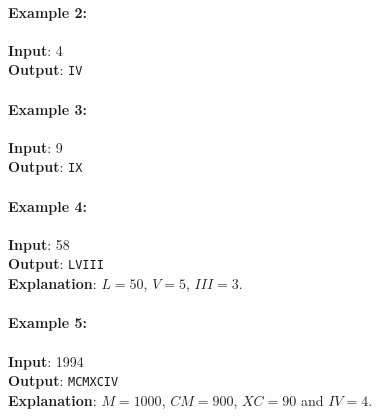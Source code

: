 \paragraph{Example 2:}
\begin{flushleft}
\textbf{Input}: 4
\\
\textbf{Output}: \texttt{IV}
\end{flushleft}

\paragraph{Example 3:}
\begin{flushleft}
\textbf{Input}: 9
\\
\textbf{Output}: \texttt{IX}
\end{flushleft}

\paragraph{Example 4:}
\begin{flushleft}
\textbf{Input}: 58
\\
\textbf{Output}: \texttt{LVIII}
\\
\textbf{Explanation}: $L = 50$, $ V = 5 $, $ III = 3 $.
\end{flushleft}

\paragraph{Example 5:}

\begin{flushleft}
\textbf{Input}: 1994
\\
\textbf{Output}: \texttt{MCMXCIV}
\\
\textbf{Explanation}: $ M = 1000 $, $ CM = 900 $, $ XC = 90 $ and $ IV = 4 $.
\end{flushleft}